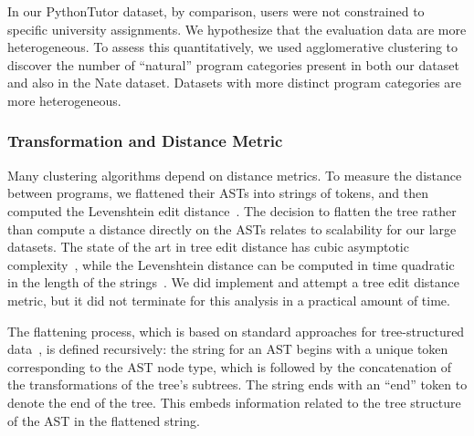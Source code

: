\documentclass[conference]{IEEEtran}
\begin{document}
In our PythonTutor dataset, by comparison, users were not constrained to
specific university assignments. We hypothesize that the evaluation data are
more heterogeneous. To assess this quantitatively, we used agglomerative
clustering to discover the number of ``natural'' program categories
present in both our dataset and also in the Nate dataset. Datasets with
more distinct program categories are more heterogeneous.



\subsubsection{Transformation and Distance Metric}

Many clustering algorithms depend on distance metrics.
To measure the distance between programs, we flattened their ASTs into
strings of tokens, and then computed the Levenshtein edit
distance~\cite{levenshtein}. The decision to flatten the tree rather than
compute a distance directly on the ASTs relates to scalability for our
large datasets. The state of the art in tree edit distance has cubic
asymptotic complexity~\cite{PAWLIK2016157}, while the Levenshtein distance
can be computed in time quadratic in the length of the
strings~\cite{lev-quadratic}. We did implement and attempt a tree edit
distance metric, but it did not terminate for this analysis in a practical
amount of time.

The flattening process, which is based on standard approaches for
tree-structured data~\cite{dist-site}, is defined recursively: the string
for an AST begins with a unique token corresponding to the AST node type,
which is followed by the concatenation of the transformations of the tree's
subtrees.  The string ends with an ``end'' token to denote the end of the
tree. This embeds information related to the tree structure of the AST in
the flattened string.
\end{document}
